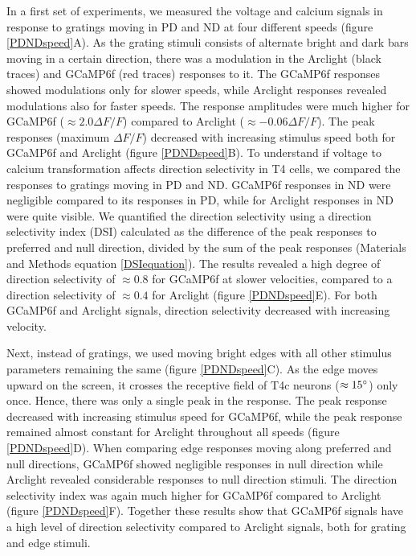 \documentclass[9pt,lineno]{elife}
\begin{document}
In a first set of experiments, we measured the voltage and calcium signals in response to gratings moving in PD and ND at four different speeds (figure \ref{PDNDspeed}A). As the grating stimuli consists of alternate bright and dark bars moving in a certain direction, there was a modulation in the Arclight (black traces) and GCaMP6f (red traces) responses to it. The GCaMP6f responses showed modulations only for slower speeds, while Arclight responses revealed modulations also for faster speeds. The response amplitudes were much higher for GCaMP6f ($\approx2.0 \Delta F/F$) compared to Arclight ($\approx -0.06 \Delta F/F$). The peak responses (maximum $\Delta F/F$) decreased with increasing stimulus speed both for GCaMP6f and Arclight (figure \ref{PDNDspeed}B). To understand if voltage to calcium transformation affects direction selectivity in T4 cells, we compared the responses to gratings moving in PD and ND. GCaMP6f responses in ND were negligible compared to its responses in PD, while for Arclight responses in ND were quite visible. We quantified the direction selectivity using a direction selectivity index (DSI) calculated as the difference of the peak responses to preferred and null direction, divided by the sum of the peak responses (Materials and Methods equation \eqref{DSIequation}). The results revealed a high degree of direction selectivity of $\approx0.8$ for GCaMP6f at slower velocities, compared to a direction selectivity of $\approx0.4$ for Arclight (figure \ref{PDNDspeed}E). For both GCaMP6f and Arclight signals, direction selectivity decreased with increasing velocity.

Next, instead of gratings, we used moving bright edges with all other stimulus parameters remaining the same (figure \ref{PDNDspeed}C). As the edge moves upward on the screen, it crosses the receptive field of T4c neurons ($\approx15\degree$) only once. Hence, there was only a single peak in the response. The peak response decreased with increasing stimulus speed for GCaMP6f, while the peak response remained almost constant for Arclight throughout all speeds (figure \ref{PDNDspeed}D). When comparing edge responses moving along preferred and null directions, GCaMP6f showed negligible responses in null direction while Arclight revealed considerable responses to null direction stimuli. The direction selectivity index was again much higher for GCaMP6f compared to Arclight (figure \ref{PDNDspeed}F). Together these results show that GCaMP6f signals have a high level of direction selectivity compared to Arclight signals, both for grating and edge stimuli.
\end{document}
